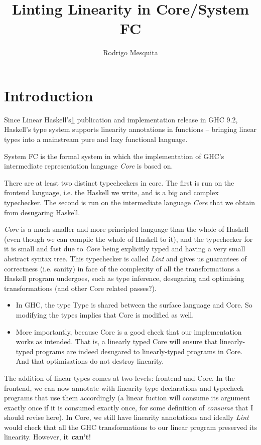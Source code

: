 \documentclass[10pt, a4paper, draft]{article}
\title{Linting Linearity in Core/System FC}
\author{Rodrigo Mesquita}
\begin{document}
\maketitle

\section{Introduction}

Since Linear Haskell's\ref{}
publication and implementation release in GHC 9.2, Haskell's type system
supports linearity annotations in functions -- bringing linear types into a
mainstream pure and lazy functional language.

System FC is the formal system in which the implementation of GHC's intermediate
representation language \emph{Core} is based on.

There are at least two distinct typecheckers in core. The first is run on the frontend
language, i.e. the Haskell we write, and is a big and complex typechecker. The
second is run on the intermediate language \emph{Core} that we obtain from
desugaring Haskell.

\emph{Core} is a much smaller and more principled language than the whole of
Haskell (even though we can compile the whole of Haskell to it), and the
typechecker for it is small and fast due to \emph{Core} being explicitly typed
and having a very small abstract syntax tree. This typechecker is called
\emph{Lint} and gives us guarantees of correctness (i.e. sanity) in face of
the complexity of all the transformations a Haskell program undergoes, such as
type inference, desugaring and optimising transformations (and other Core
related passes?).

\begin{itemize}
    \item In GHC, the type Type is shared between the surface language and Core.
        So modifying the types implies that Core is modified as well. 

    \item More importantly, because Core is a good check that our implementation
        works as intended. That is, a linearly typed Core will ensure that
        linearly-typed programs are indeed desugared to linearly-typed programs
        in Core. And that optimisations do not destroy linearity.
\end{itemize}

The addition of linear types comes at two levels: frontend and Core.
In the frontend, we can now annotate with linearity type declarations and
typecheck programs that use them accordingly (a linear fuction will consume its
argument exactly once if it is consumed exactly once, for some definition of
\emph{consume} that I should revise here). In Core, we still have linearity
annotations and ideally \emph{Lint} would check that all the GHC transformations
to our linear program preserved its linearity. However, \textbf{it can't}!
\end{document}
